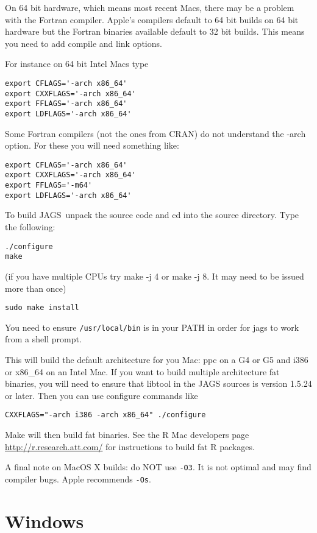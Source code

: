 \documentclass[11pt, a4paper, titlepage]{article}
\newcommand{\JAGS}{\textsf{JAGS}}
\newcommand{\code}[1]{{\bgroup{\normalfont\ttfamily #1}\egroup}}
\let\command=\code
\begin{document}
On 64 bit hardware, which means most recent Macs, there may be a 
problem with the Fortran compiler.  Apple's compilers default to 64 bit 
builds on 64 bit hardware but the Fortran binaries available default to 
32 bit builds. This means you need to add compile and link options.

For instance on 64 bit Intel Macs type
\begin{verbatim}
export CFLAGS='-arch x86_64'
export CXXFLAGS='-arch x86_64'
export FFLAGS='-arch x86_64'
export LDFLAGS='-arch x86_64'
\end{verbatim}

Some Fortran compilers (not the ones from CRAN) do not understand 
the -arch option. For these you will need something like:
\begin{verbatim}
export CFLAGS='-arch x86_64'
export CXXFLAGS='-arch x86_64'
export FFLAGS='-m64'
export LDFLAGS='-arch x86_64'
\end{verbatim}

To build \JAGS\ unpack the source code and cd into the source  
directory. Type the following:
\begin{verbatim}
./configure
make
\end{verbatim}
(if you have multiple CPUs try \command{make -j 4} or
\command{make -j 8}. It may need to be issued more than once)
\begin{verbatim}
sudo make install
\end{verbatim}

You need to ensure \texttt{/usr/local/bin} is in your PATH in order
for \command{jags} to work from a shell prompt.

This will build the default architecture for you Mac: ppc on a G4 or
G5 and i386 or \code{x86\_64} on an Intel Mac.  If you want to build
multiple architecture fat binaries, you will need to ensure that
libtool in the JAGS sources is version 1.5.24 or later.  Then you can
use configure commands like
\begin{verbatim}
CXXFLAGS="-arch i386 -arch x86_64" ./configure
\end{verbatim}

Make will then build fat binaries.  See the R Mac developers page 
\url{http://r.research.att.com/} for instructions to build fat R packages.

A final note on MacOS X builds: do NOT use \texttt{-O3}.  It is not optimal 
and may find compiler bugs.  Apple recommends \texttt{-Os}.

\clearpage
\section{Windows}
\label{section:windows}
\end{document}
